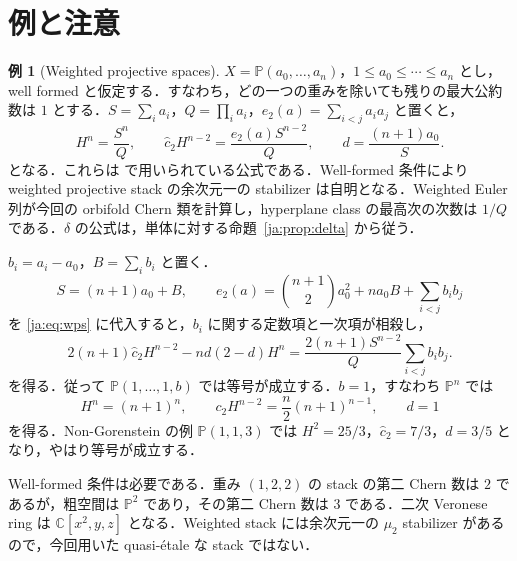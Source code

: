 \documentclass[12pt]{amsart}
\theoremstyle{definition}
\theoremstyle{remark}
\numberwithin{equation}{section}
\theoremstyle{plain}
\theoremstyle{definition}
\newtheorem{jeg}[thm]{例}
\theoremstyle{remark}
\begin{document}
\section{例と注意}\label{ja:sec:examples}
\begin{jeg}[Weighted projective spaces]\label{ja:ex:wps}
$X=\mathbb P(a_0,\ldots,a_n)$，$1\le a_0\le\cdots\le a_n$ とし，well formed と仮定する．すなわち，どの一つの重みを除いても残りの最大公約数は $1$ とする．$S=\sum_i a_i$，$Q=\prod_i a_i$，$e_2(a)=\sum_{i<j}a_i a_j$ と置くと，
\begin{equation}\label{ja:eq:wps}
 H^n=\frac{S^n}{Q},\qquad
 \widehat c_2H^{n-2}=\frac{e_2(a)S^{n-2}}Q,\qquad
 d=\frac{(n+1)a_0}{S}.
\end{equation}
となる．これらは \cite[Example~7.5, (7.7)--(7.10)]{ja:HI} で用いられている公式である．Well-formed 条件により weighted projective stack の余次元一の stabilizer は自明となる．Weighted Euler 列が今回の orbifold Chern 類を計算し，hyperplane class の最高次の次数は $1/Q$ である．$\delta$ の公式は，単体に対する命題~\ref{ja:prop:delta} から従う．

$b_i=a_i-a_0$，$B=\sum_i b_i$ と置く．
\[
S=(n+1)a_0+B,\qquad
e_2(a)=\binom{n+1}{2}a_0^2+na_0B+\sum_{i<j}b_i b_j
\]
を \eqref{ja:eq:wps} に代入すると，$b_i$ に関する定数項と一次項が相殺し，
\begin{equation}\label{ja:eq:wps-gap}
 2(n+1)\widehat c_2H^{n-2}-nd(2-d)H^n
 =\frac{2(n+1)S^{n-2}}Q\sum_{i<j}b_i b_j.
\end{equation}
を得る．従って $\mathbb P(1,\ldots,1,b)$ では等号が成立する．$b=1$，すなわち $\mathbb P^n$ では
\[
H^n=(n+1)^n,\qquad c_2H^{n-2}=\frac n2(n+1)^{n-1},\qquad d=1
\]
を得る．Non-Gorenstein の例 $\mathbb P(1,1,3)$ では $H^2=25/3$，$\widehat c_2=7/3$，$d=3/5$ となり，やはり等号が成立する．

Well-formed 条件は必要である．重み $(1,2,2)$ の stack の第二 Chern 数は $2$ であるが，粗空間は $\mathbb P^2$ であり，その第二 Chern 数は $3$ である．二次 Veronese ring は $\mathbb C[x^2,y,z]$ となる．Weighted stack には余次元一の $\mu_2$ stabilizer があるので，今回用いた quasi-\'{e}tale な stack ではない．
\end{jeg}
\end{document}
